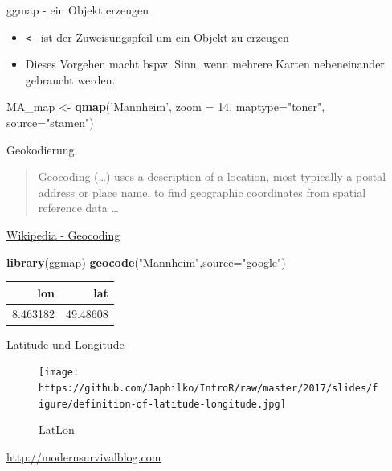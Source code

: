 \documentclass[ignorenonframetext,]{beamer}
\newenvironment{Shaded}{}{}
\newcommand{\KeywordTok}[1]{\textcolor[rgb]{0.00,0.44,0.13}{\textbf{{#1}}}}
\newcommand{\DataTypeTok}[1]{\textcolor[rgb]{0.56,0.13,0.00}{{#1}}}
\newcommand{\DecValTok}[1]{\textcolor[rgb]{0.25,0.63,0.44}{{#1}}}
\newcommand{\StringTok}[1]{\textcolor[rgb]{0.25,0.44,0.63}{{#1}}}
\newcommand{\NormalTok}[1]{{#1}}
\providecommand{\tightlist}{%
\setlength{\itemsep}{0pt}\setlength{\parskip}{0pt}}
\begin{document}
\begin{frame}[fragile]{ggmap - ein Objekt erzeugen}

\begin{itemize}
\tightlist
\item
  \texttt{\textless{}-} ist der Zuweisungspfeil um ein Objekt zu
  erzeugen
\item
  Dieses Vorgehen macht bspw. Sinn, wenn mehrere Karten nebeneinander
  gebraucht werden.
\end{itemize}

\begin{Shaded}
\begin{Highlighting}[]
\NormalTok{MA_map <-}\StringTok{ }\KeywordTok{qmap}\NormalTok{(}\StringTok{'Mannheim'}\NormalTok{, }
               \DataTypeTok{zoom =} \DecValTok{14}\NormalTok{,}
               \DataTypeTok{maptype=}\StringTok{"toner"}\NormalTok{,}
               \DataTypeTok{source=}\StringTok{"stamen"}\NormalTok{)}
\end{Highlighting}
\end{Shaded}

\end{frame}

\begin{frame}[fragile]{Geokodierung}

\begin{quote}
Geocoding (\ldots{}) uses a description of a location, most typically a
postal address or place name, to find geographic coordinates from
spatial reference data \ldots{}
\end{quote}

\href{https://github.com/adam-p/markdown-here/wiki/Markdown-Cheatsheet\#blockquotes}{Wikipedia
- Geocoding}

\begin{Shaded}
\begin{Highlighting}[]
\KeywordTok{library}\NormalTok{(ggmap)}
\KeywordTok{geocode}\NormalTok{(}\StringTok{"Mannheim"}\NormalTok{,}\DataTypeTok{source=}\StringTok{"google"}\NormalTok{)}
\end{Highlighting}
\end{Shaded}

\begin{longtable}[]{@{}rr@{}}
\toprule
lon & lat\tabularnewline
\midrule
\endhead
8.463182 & 49.48608\tabularnewline
\bottomrule
\end{longtable}

\end{frame}

\begin{frame}{Latitude und Longitude}

\begin{figure}[htbp]
\centering
\texttt{[image: https://github.com/Japhilko/IntroR/raw/master/2017/slides/figure/definition-of-latitude-longitude.jpg]}
\caption{LatLon}
\end{figure}

\href{http://modernsurvivalblog.com/survival-skills/basic-map-reading-latitude-longitude/}{http://modernsurvivalblog.com}

\end{frame}
\end{document}
